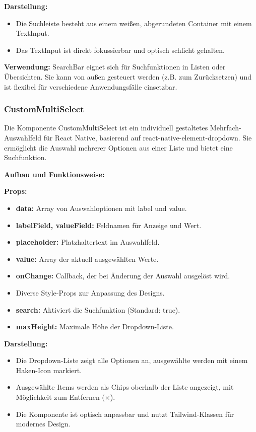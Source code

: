 \documentclass[12pt, a4paper]{report} %
\begin{document}
\textbf{Darstellung:}
\begin{itemize}
    \item Die Suchleiste besteht aus einem weißen, abgerundeten Container mit einem TextInput.
    \item Das TextInput ist direkt fokussierbar und optisch schlicht gehalten.
\end{itemize}

\noindent\textbf{Verwendung:} SearchBar eignet sich für Suchfunktionen in Listen oder Übersichten. Sie kann von außen gesteuert werden (z.B. zum Zurücksetzen) und ist flexibel für verschiedene Anwendungsfälle einsetzbar.

\subsubsection{CustomMultiSelect}
Die Komponente CustomMultiSelect ist ein individuell gestaltetes Mehrfach-Auswahlfeld für React Native, basierend auf react-native-element-dropdown. Sie ermöglicht die Auswahl mehrerer Optionen aus einer Liste und bietet eine Suchfunktion.

\noindent\textbf{Aufbau und Funktionsweise:}

\textbf{Props:}
\begin{itemize}
    \item \textbf{data:} Array von Auswahloptionen mit label und value.
    \item \textbf{labelField, valueField:} Feldnamen für Anzeige und Wert.
    \item \textbf{placeholder:} Platzhaltertext im Auswahlfeld.
    \item \textbf{value:} Array der aktuell ausgewählten Werte.
    \item \textbf{onChange:} Callback, der bei Änderung der Auswahl ausgelöst wird.
    \item Diverse Style-Props zur Anpassung des Designs.
    \item \textbf{search:} Aktiviert die Suchfunktion (Standard: true).
    \item \textbf{maxHeight:} Maximale Höhe der Dropdown-Liste.
\end{itemize}

\textbf{Darstellung:}
\begin{itemize}
    \item Die Dropdown-Liste zeigt alle Optionen an, ausgewählte werden mit einem Haken-Icon markiert.
    \item Ausgewählte Items werden als Chips oberhalb der Liste angezeigt, mit Möglichkeit zum Entfernen (×).
    \item Die Komponente ist optisch anpassbar und nutzt Tailwind-Klassen für modernes Design.
\end{itemize}
\end{document}
